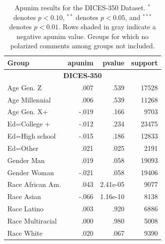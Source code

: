 \documentclass{article} %
\theoremstyle{definition}
\theoremstyle{plain}
\begin{document}
\begin{table}[t]
	\centering
	\small 
	\begin{tabularx}{\columnwidth}{X r r r}
		\toprule
		\textbf{Group} & \textbf{apunim} & \textbf{pvalue} & \textbf{support} \\
		\midrule
		
		\multicolumn{4}{c}{\textbf{DICES-350}} \\
		\midrule
		
		Age Gen. Z & .007 & .539 & 17528 \\
		Age Millennial & .006 & .539 & 11268 \\
		\rowcolor{gray!15}
		Age Gen. X+ & -.019 & .166 & 9703 \\
		\rowcolor{gray!15}
		Ed=College + & -.012 & .234 & 23475 \\
		\rowcolor{gray!15}
		Ed=High school & -.015 & .186 & 12833 \\
		Ed=Other & .021 & .025 & 2191 \\
		Gender Man & .019 & .058 & 19093 \\
		\rowcolor{gray!15}
		Gender Woman & -.021 & .058 & 19406 \\
		Race African Am. & .043 & 2.41e-05 & 9077 \\
		\rowcolor{gray!15}
		Race Asian & -.066 & 1.16e-10 & 8138 \\
		Race Latino & .003 & .920 & 6886 \\
		Race Multiracial & .000 & .980 & 5008 \\
		Race White & .020 & .067 & 9390 \\
		\bottomrule
	\end{tabularx}
	\caption{Apunim results for the DICES-350 Dataset. $^{*}$ denotes $p<0.10$, $^{**}$ denotes $p<0.05$, and $^{***}$ denotes $p<0.01$.  Rows shaded in gray indicate a negative $\text{apunim}$ value. Groups for which no polarized comments among groups not included.}
	\label{tab:dices350-full}
\end{table}
\end{document}

